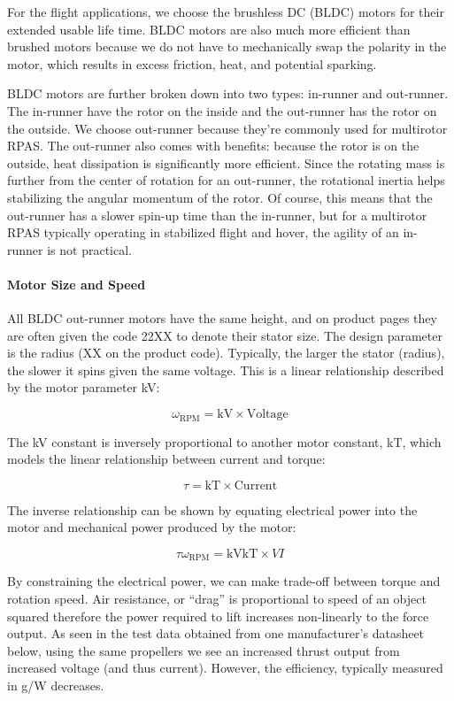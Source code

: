 For the flight applications, we choose the brushless DC (BLDC) motors for their extended usable life time. 
BLDC motors are also much more efficient than brushed motors because we do not have to mechanically swap 
the polarity in the motor, which results in excess friction, heat, and potential sparking.

BLDC motors are further broken down into two types: in-runner and out-runner. The in-runner have the rotor 
on the inside and the out-runner has the rotor on the outside. We choose out-runner because they’re 
commonly used for multirotor RPAS. The out-runner also comes with benefits: because the rotor is on the 
outside, heat dissipation is significantly more efficient. Since the rotating mass is further from the 
center of rotation for an out-runner, the rotational inertia helps stabilizing the angular momentum of the 
rotor. Of course, this means that the out-runner has a slower spin-up time than the in-runner, but for a 
multirotor RPAS typically operating in stabilized flight and hover, the agility of an in-runner is not 
practical.

\paragraph{Motor Size and Speed}

All BLDC out-runner motors have the same height, and on product pages they are often given the code 22XX to denote their stator size. The design parameter is the radius (XX on the product code). Typically, the larger the stator (radius), the slower it spins given the same voltage. This is a linear relationship described by the motor parameter kV:

$$
\omega_{\mathrm{RPM}} = \mathrm{kV} \times \mathrm{Voltage}
$$

The kV constant is inversely proportional to another motor constant, kT, which models the linear relationship between current and torque:

$$
\tau = \mathrm{kT} \times \mathrm{Current}
$$

The inverse relationship can be shown by equating electrical power into the motor and mechanical power produced by the motor:

$$
\tau\omega_{\mathrm{RPM}} = \mathrm{kV}\mathrm{kT}\times VI
$$

By constraining the electrical power, we can make trade-off between torque and rotation speed.
Air resistance, or “drag” is proportional to speed of an object squared therefore the power required to 
lift increases non-linearly to the force output. As seen in the test data obtained from one manufacturer’s 
datasheet below, using the same propellers we see an increased thrust output from increased voltage (and 
thus current). However, the efficiency, typically measured in g/W decreases. 

